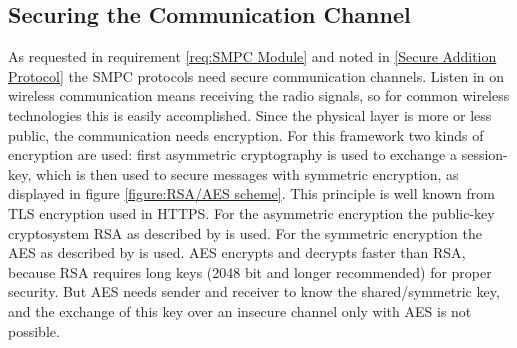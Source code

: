 




\FloatBarrier

\subsection{Securing the Communication Channel} \label{Securing the Communication Channel}

As requested in requirement \ref{req:SMPC Module} and noted in \ref{Secure Addition Protocol} the \gls{SMPC} protocols need secure communication channels. Listen in on wireless communication means receiving the radio signals, so for common wireless technologies this is easily accomplished. Since the physical layer is more or less public, the communication needs encryption. 
For this framework two kinds of encryption are used: first asymmetric cryptography is used to exchange a session-key, which is then used to secure messages with symmetric encryption, as displayed in figure \ref{figure:RSA/AES scheme}. This principle is well known from \gls{TLS} encryption used in \gls{HTTPS}. For the asymmetric encryption the public-key cryptosystem \acs{RSA} as described by \textcite[pp. 49-76]{Delfs2015} is used. For the symmetric encryption the \gls{AES} as described by \textcite[pp. 19-25]{Delfs2015} is used.
\gls{AES} encrypts and decrypts faster than \gls{RSA}, because \gls{RSA} requires long keys (2048 bit and longer recommended) for proper security. But \gls{AES} needs sender and receiver to know the shared/symmetric key, and the exchange of this key over an insecure channel only with \gls{AES} is not possible.

